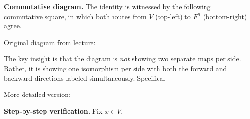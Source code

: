 \documentclass[12pt]{article}
\theoremstyle{remark}
\theoremstyle{definition}
\begin{document}
\medskip
\noindent\textbf{Commutative diagram.}
The identity is witnessed by the following commutative square,
in which both routes from $V$ (top-left) to $F^n$ (bottom-right) agree.

Original diagram from lecture:\\

\begin{center}
\end{center}



\noindent The key insight is that the diagram is \emph{not} showing two
separate maps per side. Rather, it is showing one isomorphism per side
with both the forward and backward directions labeled simultaneously.
Specifical

More detailed version:\\
\begin{center}
\end{center}

\medskip
\noindent\textbf{Step-by-step verification.}
Fix $x \in V$.
\end{document}
